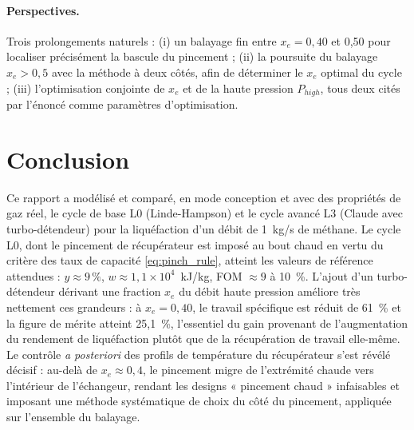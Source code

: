 \paragraph{Perspectives.}
Trois prolongements naturels : (i) un balayage fin entre $x_e = 0{,}40$ et
0{,}50 pour localiser précisément la bascule du pincement ; (ii) la
poursuite du balayage $x_e > 0{,}5$ avec la méthode à deux côtés, afin de
déterminer le $x_e$ optimal du cycle ; (iii) l'optimisation conjointe de
$x_e$ et de la haute pression $P_{high}$, tous deux cités par l'énoncé comme
paramètres d'optimisation.

\section*{Conclusion}

Ce rapport a modélisé et comparé, en mode conception et avec des propriétés
de gaz réel, le cycle de base L0 (Linde-Hampson) et le cycle avancé L3
(Claude avec turbo-détendeur) pour la liquéfaction d'un débit de 1~kg/s de
méthane. Le cycle L0, dont le pincement de récupérateur est imposé au bout
chaud en vertu du critère des taux de capacité
\eqref{eq:pinch_rule}, atteint les valeurs de référence attendues :
$y \approx 9\,\%$, $w \approx 1{,}1 \times 10^{4}$~kJ/kg, FOM
$\approx 9$ à 10~\%. L'ajout d'un turbo-détendeur dérivant une fraction
$x_e$ du débit haute pression améliore très nettement ces grandeurs : à
$x_e = 0{,}40$, le travail spécifique est réduit de 61~\% et la figure de
mérite atteint 25{,}1~\%, l'essentiel du gain provenant de l'augmentation du
rendement de liquéfaction plutôt que de la récupération de travail elle-même.
Le contrôle \emph{a posteriori} des profils de température du récupérateur
s'est révélé décisif : au-delà de $x_e \approx 0{,}4$, le pincement migre de
l'extrémité chaude vers l'intérieur de l'échangeur, rendant les designs
« pincement chaud » infaisables et imposant une méthode systématique de choix
du côté du pincement, appliquée sur l'ensemble du balayage.


